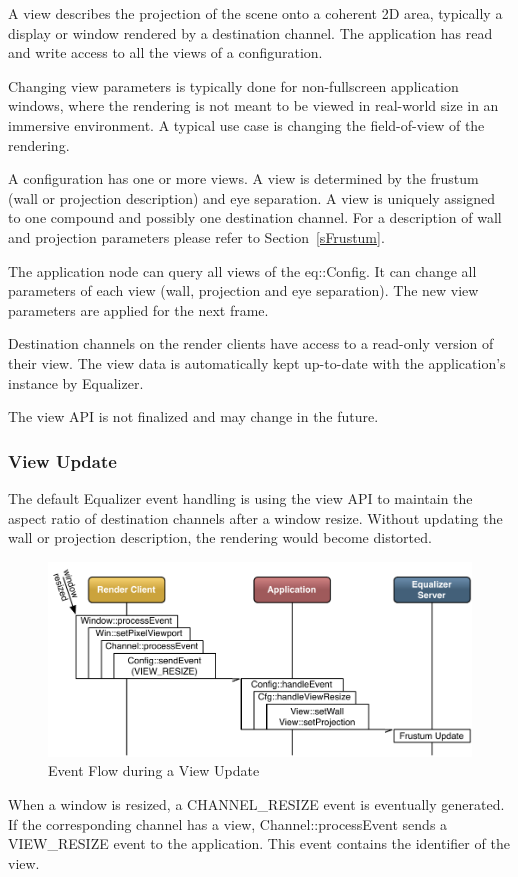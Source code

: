 \documentclass[10pt,a4]{scrartcl}
\newcommand{\sref}[1]{Section~\ref{#1}}
\begin{document}
A view describes the projection of the scene onto a coherent 2D area,
typically a display or window rendered by a destination channel. The
application has read and write access to all the views of a
configuration.

Changing view parameters is typically done for non-fullscreen
application windows, where the rendering is not meant to be viewed in
real-world size in an immersive environment. A typical use case is
changing the field-of-view of the rendering.

A configuration has one or more views. A view is determined by the
frustum (wall or projection description) and eye separation. A view is
uniquely assigned to one compound and possibly one destination
channel. For a description of wall and projection parameters please
refer to \sref{sFrustum}.

The application node can query all views of the \textsf{eq::Config}. It
can change all parameters of each view (wall, projection and eye
separation). The new view parameters are applied for the next frame.

Destination channels on the render clients have access to a read-only
version of their view. The view data is automatically kept up-to-date
with the application's instance by Equalizer.

The view API is not finalized and may change in the future.

\subsubsection{View Update}

The default Equalizer event handling is using the view API to maintain
the aspect ratio of destination channels after a window resize. Without
updating the wall or projection description, the rendering would become distorted.

\begin{figure}
  \includegraphics[width=.618\textwidth]{images/viewUpdate.pdf}
  {\caption{\small\label{fViewUpdate}Event Flow during a View Update}}
\end{figure}
When a window is resized, a \textsf{CHANNEL\_RESIZE} event is eventually
generated. If the corresponding channel has a view,
\textsf{Channel::processEvent} sends a \textsf{VIEW\_RESIZE} event to
the application. This event contains the identifier of the view. 
\end{document}
